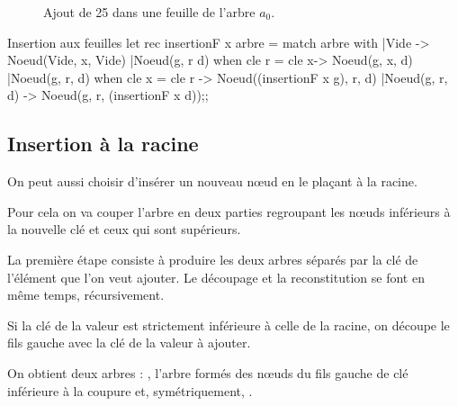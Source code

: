 \begin{figure*}[h]
\centering
{}
\caption{Ajout de 25 dans une feuille de l'arbre $a_0$.}
\end{figure*}
\begin{code}{Insertion aux feuilles}
let rec insertionF x arbre = 
  match arbre with
  |Vide -> Noeud(Vide, x,  Vide)
  |Noeud(g, r d) when cle r = cle x-> Noeud(g, x, d)
  |Noeud(g, r, d) when cle x = cle r
                  -> Noeud((insertionF x  g), r, d)
  |Noeud(g, r, d) -> Noeud(g, r, (insertionF x  d));;
\end{code}
\subsection{Insertion à la racine}
On peut aussi choisir d'insérer un nouveau nœud en le plaçant à la racine.

Pour cela on va couper l'arbre en deux parties regroupant les nœuds inférieurs à la nouvelle clé et ceux qui sont supérieurs.

La première étape consiste à produire les deux arbres séparés par la clé de l'élément que l'on veut ajouter. Le découpage et la reconstitution se font en même temps, récursivement.

Si la clé de la valeur est strictement inférieure à celle de la racine, on découpe le fils gauche avec la clé de la valeur à ajouter.

On obtient deux arbres : , l'arbre formés des nœuds du fils gauche de clé inférieure à la coupure et, symétriquement, .

